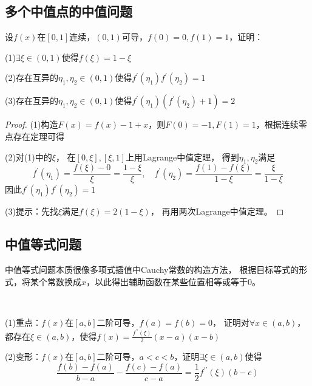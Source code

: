 \subsection{多个中值点的中值问题}



\begin{exercise}[经典两个中值点的问题]
  设$f(x)$在$[0,1]$连续，$(0,1)$可导，$f(0) = 0, f(1) = 1$，证明：

  (1)$\exists \xi \in (0,1)$使得$f(\xi) = 1 - \xi$

  (2)存在互异的$\eta_1,\eta_2 \in (0,1)$使得$f^{\prime}(\eta_1)f^{\prime}(\eta_2) = 1$

  (3)存在互异的$\eta_1,\eta_2  \in (0,1)$使得$f^{\prime}(\eta_1)(f^{\prime}(\eta_2) + 1) = 2$
\end{exercise}

\begin{proof}
  (1)构造$F(x) = f(x) - 1 + x$，则$F(0) = -1, F(1) = 1$，根据连续零点存在定理可得

  (2)对(1)中的$\xi$，
  在$[0,\xi],[\xi,1]$上用Lagrange中值定理，
  得到$\eta_1,\eta_2$满足
  \begin{equation*}
    f^{\prime}(\eta_1) = \frac{f(\xi) - 0}{\xi} = \frac{1 - \xi}{\xi}, \quad f^{\prime}(\eta_2) = \frac{f(1) - f(\xi)}{1 - \xi} = \frac{\xi}{1 - \xi}
  \end{equation*}
  因此$f^{\prime}(\eta_1)f^{\prime}(\eta_2) = 1$

  (3)提示：先找$\xi$满足$f(\xi) = 2(1 - \xi)$，
  再用两次Lagrange中值定理。
\end{proof}







\subsection{中值等式问题}

中值等式问题本质很像多项式插值中Cauchy常数的构造方法，
根据目标等式的形式，将某个常数换成$x$，以此得出辅助函数在某些位置相等或等于$0$。

~

\begin{exercise}[利用等式构造辅助函数]
  (1)重点：$f(x)$在$[a,b]$二阶可导，$f(a) = f(b) = 0$，
  证明对$\forall x \in (a,b)$，都存在$\xi \in (a,b)$，使得$f(x) = \frac{f^{\prime\prime}(\xi)}{2}(x-a)(x-b)$

  (2)变形：$f(x)$在$[a,b]$二阶可导，$a < c < b$，证明$\exists \xi \in (a,b)$使得
  \begin{equation*}
    \frac{f(b) - f(a)}{b - a} - \frac{f(c) - f(a)}{c - a} = \frac{1}{2}f^{\prime\prime}(\xi)(b - c)
  \end{equation*}
\end{exercise}


